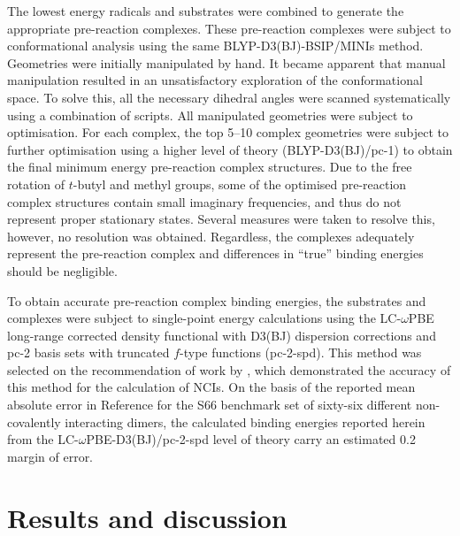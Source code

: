 The lowest energy radicals and substrates were combined to generate the appropriate pre-reaction complexes. These pre-reaction complexes were subject to conformational analysis using the same BLYP-D3(BJ)-BSIP/MINIs method. Geometries were initially manipulated by hand. It became apparent that manual manipulation resulted in an unsatisfactory exploration of the conformational space. To solve this, all the necessary dihedral angles were scanned systematically using a combination of scripts.\cite{note5} All manipulated geometries were subject to optimisation. For each complex, the top 5--10 complex geometries were subject to further optimisation using a higher level of theory (BLYP-D3(BJ)/pc-1) to obtain the final minimum energy pre-reaction complex structures. Due to the free rotation of $t$-butyl and methyl groups, some of the optimised pre-reaction complex structures contain small imaginary frequencies, and thus do not represent proper stationary states. Several measures were taken to resolve this, however, no resolution was obtained. Regardless, the complexes adequately represent the pre-reaction complex and differences in ``true'' binding energies should be negligible.

To obtain accurate pre-reaction complex binding energies, the substrates and complexes were subject to single-point energy calculations using the LC-$\omega$PBE long-range corrected density functional\cite{Vydrov2006,Vydrov2006a} with D3(BJ) dispersion corrections and pc-2 basis sets with truncated $f$-type functions (pc-2-spd).\cite{Johnson2013} This method was selected on the recommendation of work by \citet{Johnson2013}, which demonstrated the accuracy of this method for the calculation of NCIs. On the basis of the reported mean absolute error in Reference  for the S66 benchmark set of sixty-six different non-covalently interacting dimers,\cite{Rezac2011} the calculated binding energies reported herein from the LC-$\omega$PBE-D3(BJ)/pc-2-spd level of theory carry an estimated 0.2 \kcalmol~ margin of error.

\section{Results and discussion}

